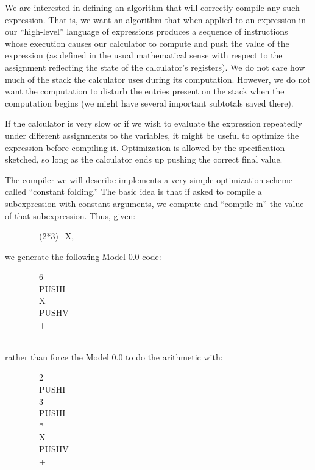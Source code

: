 \documentclass[11pt]{book}
\newenvironment{pubasis}{\begin{flushleft}\ttfamily\small}{\normalsize\rmfamily\end{flushleft}}
\begin{document}
We are interested in defining an algorithm that will correctly compile
any such expression.  That is, we want an algorithm that when applied
to an expression in our ``high-level'' language of expressions 
produces a sequence of instructions whose execution 
causes our calculator
to compute and push the value of the expression (as defined in
the usual mathematical sense with respect to the assignment
reflecting the state of the calculator's registers).
We do not care how much of the stack the calculator
uses during its computation.  However, we do not want the computation
to disturb the entries present on the stack when the computation
begins (we might have several important subtotals saved there).

If the calculator is very slow or if we wish to evaluate the expression repeatedly under
different assignments to the variables, it might be useful to optimize the expression
before compiling it.  Optimization is allowed by the specification
sketched, so long as the calculator ends up pushing the correct final value.

The compiler we will describe implements a very simple optimization scheme called
``constant folding.''  The basic idea is that if asked to compile a subexpression
with constant arguments, we compute and ``compile in'' the value of
that subexpression.  Thus, given:
\begin{pubasis}
~~~~~~~~(2*3)+X,\\
\end{pubasis}
we generate the following Model 0.0 code:
\begin{pubasis}
~~~~~~~~6\\
~~~~~~~~PUSHI\\
~~~~~~~~X\\
~~~~~~~~PUSHV\\
~~~~~~~~+\\
~~~~~~~~\\
\end{pubasis}
rather than force the Model 0.0 to do the arithmetic with:
\begin{pubasis}
~~~~~~~~2\\
~~~~~~~~PUSHI\\
~~~~~~~~3\\
~~~~~~~~PUSHI\\
~~~~~~~~*\\
~~~~~~~~X\\
~~~~~~~~PUSHV\\
~~~~~~~~+\\
\end{pubasis}
\end{document}
